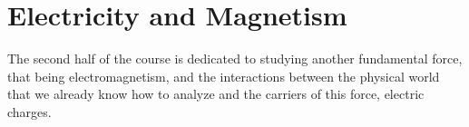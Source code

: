\part{Electricity and Magnetism}
The second half of the course is dedicated to studying another fundamental force, that being electromagnetism, and the interactions between the physical world that we already know how to analyze and the carriers of this force, electric charges.  









